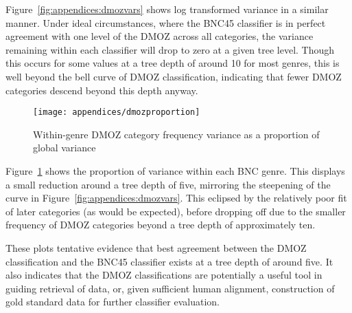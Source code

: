 Figure~\ref{fig:appendices:dmozvars} shows log transformed variance in a similar manner.  Under ideal circumstances, where the BNC45 classifier is in perfect agreement with one level of the DMOZ across all categories, the variance remaining within each classifier will drop to zero at a given tree level.  Though this occurs for some values at a tree depth of around 10 for most genres, this is well beyond the bell curve of DMOZ classification, indicating that fewer DMOZ categories descend beyond this depth anyway.

\begin{figure}[h]
    \centering
    \texttt{[image: appendices/dmozproportion]}
    \caption{Within-genre DMOZ category frequency variance as a proportion of global variance}
    \label{fig:appendices:dmozproportion}
\end{figure}

\FloatBarrier

Figure~\ref{fig:appendices:dmozproportion} shows the proportion of variance within each BNC genre.  This displays a small reduction around a tree depth of five, mirroring the steepening of the curve in Figure~\ref{fig:appendices:dmozvars}.  This eclipsed by the relatively poor fit of later categories (as would be expected), before dropping off due to the smaller frequency of DMOZ categories beyond a tree depth of approximately ten.

These plots tentative evidence that best agreement between the DMOZ classification and the BNC45 classifier exists at a tree depth of around five.  It also indicates that the DMOZ classifications are potentially a useful tool in guiding retrieval of data, or, given sufficient human alignment, construction of gold standard data for further classifier evaluation.



